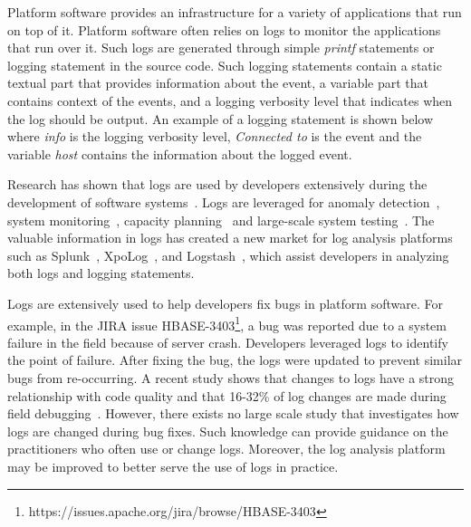 Platform software provides an infrastructure for a variety of applications that run on top of it. Platform software often relies on logs to monitor the applications that run over it. Such logs are generated through simple \textsl{printf} statements or logging statement in the source code. Such logging statements contain a static textual part that provides information about the event,  a variable part that contains context of the events, and a logging verbosity level that indicates when the log should be output. An example of a logging statement is shown below where \emph{info} is the logging verbosity level, \emph{Connected to} is the event and the variable \emph{host} contains the information about the logged event. 

%
% 

Research has shown that logs are used by developers extensively during the development of software systems~\cite{Characterizinglogs}. Logs are leveraged for anomaly detection~\cite{XUanomalies,ConsoleLogs,Marksyer}, system monitoring~\cite{Bitperformance}, capacity planning~\cite{IanWCRE} and large-scale system testing~\cite{markTesting}. The valuable information in logs has created a new market for log analysis platforms such as Splunk~\cite{Bitperformance}, XpoLog~\cite{Xpolog}, and Logstash~\cite{Logstash}, which assist developers in analyzing both logs and logging statements.

 
Logs are extensively used to help developers fix bugs in platform software. For example, in the JIRA issue HBASE-3403\footnote{https://issues.apache.org/jira/browse/HBASE-3403}, a bug was reported due to a system failure in the field because of server crash. Developers leveraged logs to identify the point of failure. After fixing the bug, the logs were updated to prevent similar bugs from re-occurring. A recent study shows that changes to logs have a strong relationship with code quality and that 16-32\%
of log changes are made during field debugging~\cite{EMSEIAN}. However, there exists no large scale study that investigates how logs are changed during bug fixes. Such knowledge can provide guidance on the practitioners who often use or change logs. Moreover, the log analysis platform may be improved to better serve the use of logs in practice.



